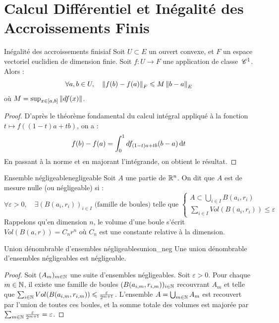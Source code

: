 \section{Calcul Différentiel et Inégalité des Accroissements Finis}

\begin{theoreme}{Inégalité des accroissements finis}{iaf}
    Soit $U \subset E$ un ouvert convexe, et $F$ un espace vectoriel euclidien de dimension finie. Soit $f : U \to F$ une application de classe $\,\mathscr C^{1}$. Alors :
    \[ \forall a,b \in U, \quad \left\|f(b) - f(a)\right\|_F \leqslant M \left\|b - a\right\|_E \]
    où $M = \sup_{x \in [a,b]} \left\|df(x)\right\|$.
\end{theoreme}

\begin{proof}
    D'après le théorème fondamental du calcul intégral appliqué à la fonction $t \mapsto f((1-t)a + tb)$, on a :
    \[ f(b) - f(a) = \int_0^1 df_{(1-t)a + tb}(b - a) \,\mathrm{d}t \]
    En passant à la norme et en majorant l'intégrande, on obtient le résultat.
\end{proof}

\begin{definition}{Ensemble négligeable}{negligeable}
    Soit $A$ une partie de $\mathbb{R}^n$. On dit que $A$ est de mesure nulle (ou négligeable) si :
    \[ \forall \varepsilon > 0, \quad \exists (B(a_i, r_i))_{i \in I} \text{ (famille de boules) telle que } \begin{cases} A \subset \bigcup_{i \in I} B(a_i, r_i) \\ \sum_{i \in I} Vol(B(a_i, r_i)) \leqslant \varepsilon \end{cases} \]
    Rappelons qu'en dimension $n$, le volume d'une boule s'écrit $Vol(B(a,r)) = C_n r^n$ où $C_n$ est une constante relative à la dimension.
\end{definition}

\begin{proposition}{Union dénombrable d'ensembles négligeables}{union_neg}
    Une union dénombrable d'ensembles négligeables est négligeable.
\end{proposition}

\begin{proof}
    Soit $(A_m)_{m \in \mathbb{N}}$ une suite d'ensembles négligeables. Soit $\varepsilon > 0$.
    Pour chaque $m \in \mathbb{N}$, il existe une famille de boules $(B(a_{i,m}, r_{i,m}))_{i \in \mathbb{N}}$ recouvrant $A_m$ et telle que $\sum_{i \in \mathbb{N}} Vol(B(a_{i,m}, r_{i,m})) \leqslant \frac{\varepsilon}{2^{m+1}}$.
    L'ensemble $A = \bigcup_{m \in \mathbb{N}} A_m$ est recouvert par l'union de toutes ces boules, et la somme totale des volumes est majorée par $\sum_{m \in \mathbb{N}} \frac{\varepsilon}{2^{m+1}} = \varepsilon$.
\end{proof}

